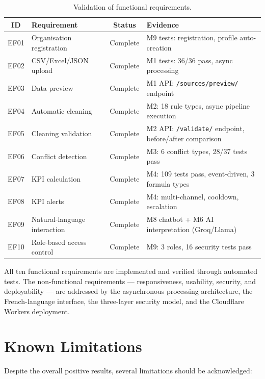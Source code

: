 \begin{table}[h!]
\centering
\caption{Validation of functional requirements.}
\label{tab:validation}
\small
\renewcommand{\arraystretch}{1.3}
\begin{tabular}{|c|p{3.8cm}|c|p{4cm}|}
\hline
\textbf{ID} & \textbf{Requirement} & \textbf{Status} & \textbf{Evidence} \\
\hline
EF01 & Organisation registration & Complete & M9 tests: registration, profile auto-creation \\
EF02 & CSV/Excel/JSON upload & Complete & M1 tests: 36/36 pass, async processing \\
EF03 & Data preview & Complete & M1 API: \texttt{/sources/preview/} endpoint \\
EF04 & Automatic cleaning & Complete & M2: 18 rule types, async pipeline execution \\
EF05 & Cleaning validation & Complete & M2 API: \texttt{/validate/} endpoint, before/after comparison \\
EF06 & Conflict detection & Complete & M3: 6 conflict types, 28/37 tests pass \\
EF07 & KPI calculation & Complete & M4: 109 tests pass, event-driven, 3 formula types \\
EF08 & KPI alerts & Complete & M4: multi-channel, cooldown, escalation \\
EF09 & Natural-language interaction & Complete & M8 chatbot + M6 AI interpretation (Groq/Llama) \\
EF10 & Role-based access control & Complete & M9: 3 roles, 16 security tests pass \\
\hline
\end{tabular}
\end{table}

\noindent
All ten functional requirements are implemented
and verified through automated tests.
The non-functional requirements — responsiveness,
usability, security, and deployability —
are addressed by the asynchronous processing architecture,
the French-language interface,
the three-layer security model,
and the Cloudflare Workers deployment.


\section{Known Limitations}

\noindent
Despite the overall positive results,
several limitations should be acknowledged:

